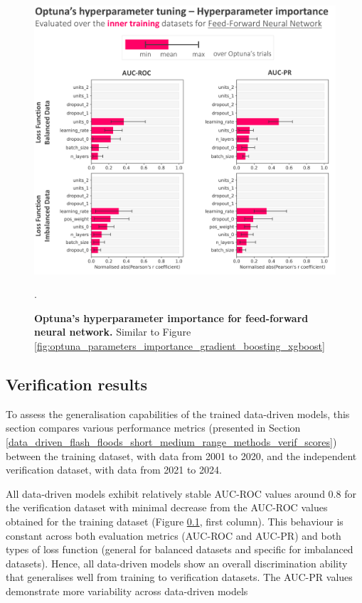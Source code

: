 \begin{figure}[htbp]
\centering
\includegraphics[scale=0.9]{optuna_parameters_importance_feed_forward_nn.png}
\caption{\textbf{Optuna's hyperparameter importance for feed-forward neural network.} Similar to Figure \ref{fig:optuna_parameters_importance_gradient_boosting_xgboost}}.
\label{fig:optuna_parameters_importance_feed_forward_nn}
\end{figure}


\subsection{Verification results}

To assess the generalisation capabilities of the trained data-driven models, this section compares various performance metrics (presented in Section \ref{data_driven_flash_floods_short_medium_range_methods_verif_scores}) between the \textcolor{colourTraining}{training dataset}, with data from 2001 to 2020, and the independent 
\textcolor{colourTest}{verification dataset}, with data from 2021 to 2024.


All data-driven models exhibit relatively stable AUC-ROC values around 0.8 for the \textcolor{colourTest}{verification dataset} with minimal decrease from the AUC-ROC values obtained for the \textcolor{colourTraining}{training dataset} (Figure \ref{}, first column). This behaviour is constant across both evaluation metrics (AUC-ROC and AUC-PR) and both types of loss function (general for balanced datasets and specific for imbalanced datasets). Hence, all data-driven models show an overall discrimination ability that generalises well from training to verification datasets. The AUC-PR values demonstrate more variability across data-driven models 








